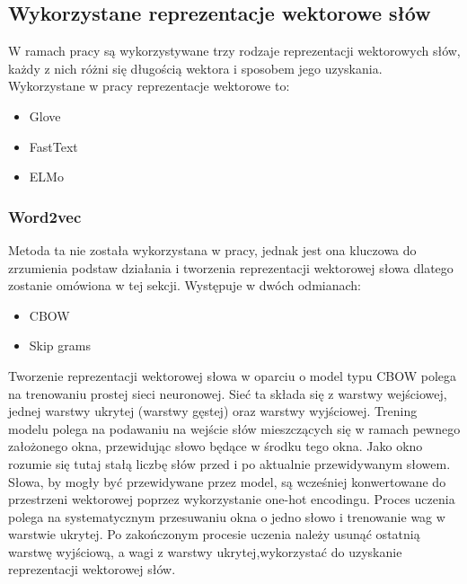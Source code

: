 






\subsection{Wykorzystane reprezentacje wektorowe słów}
W ramach pracy są wykorzystywane trzy rodzaje reprezentacji wektorowych słów, każdy z nich różni się długością wektora i sposobem jego uzyskania. Wykorzystane w pracy reprezentacje wektorowe to:
\begin{itemize}
    \item Glove
    \item FastText
    \item ELMo
\end{itemize}



\subsubsection{Word2vec}
Metoda ta nie została wykorzystana w pracy, jednak jest ona kluczowa do zrzumienia podstaw działania i tworzenia reprezentacji wektorowej słowa dlatego zostanie omówiona w tej sekcji. Występuje w dwóch odmianach:

\begin{itemize}
    \item CBOW
    \item Skip grams
\end{itemize}



\noindent Tworzenie reprezentacji wektorowej słowa w oparciu o model typu CBOW polega na trenowaniu prostej sieci neuronowej. Sieć ta składa się z warstwy wejściowej, jednej warstwy ukrytej (warstwy gęstej) oraz warstwy wyjściowej. Trening modelu polega na podawaniu na wejście słów mieszczących się w ramach pewnego założonego okna, przewidując słowo będące w środku tego okna. Jako okno rozumie się tutaj stałą liczbę słów przed i po aktualnie przewidywanym słowem. Słowa, by mogły być przewidywane przez model, są wcześniej konwertowane do przestrzeni wektorowej poprzez wykorzystanie one-hot encodingu. Proces uczenia polega na systematycznym przesuwaniu okna o jedno słowo i trenowanie wag w warstwie ukrytej. Po zakończonym procesie uczenia należy usunąć ostatnią warstwę wyjściową, a wagi z warstwy ukrytej,wykorzystać do uzyskanie reprezentacji wektorowej słów.\cite{Mikolov2013}

